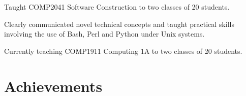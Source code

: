 \documentclass[letter]{deedy-resume} %
\begin{document}
\begin{minipage}[t]{0.66\textwidth}
\begin{tightitemize}
\item Taught COMP2041 Software Construction to two classes of 20 students.
\item Clearly communicated novel technical concepts and taught practical skills involving the use of Bash, Perl and Python under Unix systems.
\item Currently teaching COMP1911 Computing 1A to two classes of 20 students.
\end{tightitemize}

\sectionspace %












\section{Achievements} 


\end{minipage}
\end{document}
